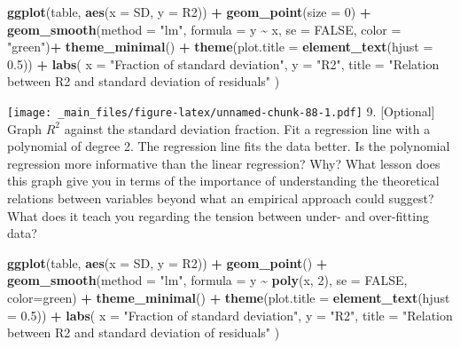\documentclass[
]{book}
\newenvironment{Shaded}{\begin{snugshade}}{\end{snugshade}}
\newcommand{\AttributeTok}[1]{\textcolor[rgb]{0.13,0.29,0.53}{#1}}
\newcommand{\ConstantTok}[1]{\textcolor[rgb]{0.56,0.35,0.01}{#1}}
\newcommand{\DecValTok}[1]{\textcolor[rgb]{0.00,0.00,0.81}{#1}}
\newcommand{\FloatTok}[1]{\textcolor[rgb]{0.00,0.00,0.81}{#1}}
\newcommand{\FunctionTok}[1]{\textcolor[rgb]{0.13,0.29,0.53}{\textbf{#1}}}
\newcommand{\NormalTok}[1]{#1}
\newcommand{\SpecialCharTok}[1]{\textcolor[rgb]{0.81,0.36,0.00}{\textbf{#1}}}
\newcommand{\StringTok}[1]{\textcolor[rgb]{0.31,0.60,0.02}{#1}}
\begin{document}
\begin{Shaded}
\begin{Highlighting}[]
\FunctionTok{ggplot}\NormalTok{(table, }\FunctionTok{aes}\NormalTok{(}\AttributeTok{x =}\NormalTok{ SD, }\AttributeTok{y =}\NormalTok{ R2)) }\SpecialCharTok{+}
  \FunctionTok{geom\_point}\NormalTok{(}\AttributeTok{size =} \DecValTok{0}\NormalTok{) }\SpecialCharTok{+}
  \FunctionTok{geom\_smooth}\NormalTok{(}\AttributeTok{method =} \StringTok{"lm"}\NormalTok{, }\AttributeTok{formula =}\NormalTok{ y }\SpecialCharTok{\textasciitilde{}}\NormalTok{ x, }\AttributeTok{se =} \ConstantTok{FALSE}\NormalTok{, }\AttributeTok{color =} \StringTok{"green"}\NormalTok{)}\SpecialCharTok{+}
  \FunctionTok{theme\_minimal}\NormalTok{() }\SpecialCharTok{+}
  \FunctionTok{theme}\NormalTok{(}\AttributeTok{plot.title =} \FunctionTok{element\_text}\NormalTok{(}\AttributeTok{hjust =} \FloatTok{0.5}\NormalTok{)) }\SpecialCharTok{+}
  \FunctionTok{labs}\NormalTok{(}
    \AttributeTok{x =} \StringTok{"Fraction of standard deviation"}\NormalTok{,}
    \AttributeTok{y =} \StringTok{"R2"}\NormalTok{,}
    \AttributeTok{title =} \StringTok{"Relation between R2 and standard deviation of residuals"}
\NormalTok{  ) }
\end{Highlighting}
\end{Shaded}

\texttt{[image: \_main\_files/figure-latex/unnamed-chunk-88-1.pdf]}
9. {[}Optional{]} Graph \(R^2\) against the standard deviation fraction. Fit a regression line with a polynomial of degree 2. The regression line fits the data better. Is the polynomial regression more informative than the linear regression? Why? What lesson does this graph give you in terms of the importance of understanding the theoretical relations between variables beyond what an empirical approach could suggest? What does it teach you regarding the tension between under- and over-fitting data?

\begin{Shaded}
\begin{Highlighting}[]
\FunctionTok{ggplot}\NormalTok{(table, }\FunctionTok{aes}\NormalTok{(}\AttributeTok{x =}\NormalTok{ SD, }\AttributeTok{y =}\NormalTok{ R2)) }\SpecialCharTok{+}
  \FunctionTok{geom\_point}\NormalTok{() }\SpecialCharTok{+}
  \FunctionTok{geom\_smooth}\NormalTok{(}\AttributeTok{method =} \StringTok{"lm"}\NormalTok{, }\AttributeTok{formula =}\NormalTok{ y }\SpecialCharTok{\textasciitilde{}} \FunctionTok{poly}\NormalTok{(x, }\DecValTok{2}\NormalTok{), }\AttributeTok{se =} \ConstantTok{FALSE}\NormalTok{, }\AttributeTok{color=}\StringTok{\textquotesingle{}green\textquotesingle{}}\NormalTok{) }\SpecialCharTok{+}
  \FunctionTok{theme\_minimal}\NormalTok{() }\SpecialCharTok{+}
  \FunctionTok{theme}\NormalTok{(}\AttributeTok{plot.title =} \FunctionTok{element\_text}\NormalTok{(}\AttributeTok{hjust =} \FloatTok{0.5}\NormalTok{)) }\SpecialCharTok{+}
  \FunctionTok{labs}\NormalTok{(}
    \AttributeTok{x =} \StringTok{"Fraction of standard deviation"}\NormalTok{,}
    \AttributeTok{y =} \StringTok{"R2"}\NormalTok{,}
    \AttributeTok{title =} \StringTok{"Relation between R2 and standard deviation of residuals"}
\NormalTok{  ) }
\end{Highlighting}
\end{Shaded}
\end{document}
